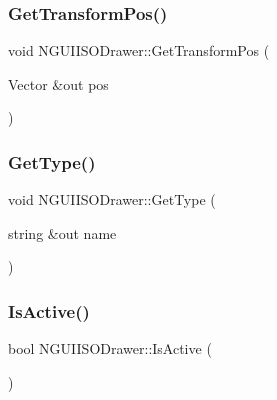 \hypertarget{class_n_g_u_i_i_s_o_drawer_a9ff810d55ed62edcabe81e67e9bb7430}{}\label{class_n_g_u_i_i_s_o_drawer_a9ff810d55ed62edcabe81e67e9bb7430} 
\subsubsection{\texorpdfstring{Get\+Transform\+Pos()}{GetTransformPos()}}
{\footnotesize\ttfamily void N\+G\+U\+I\+I\+S\+O\+Drawer\+::\+Get\+Transform\+Pos (\begin{DoxyParamCaption}\item[{Vector \&out}]{pos }\end{DoxyParamCaption})}

\hypertarget{class_n_g_u_i_i_s_o_drawer_a92a046d15ee074ef5a0ce2bc4ee4018a}{}\label{class_n_g_u_i_i_s_o_drawer_a92a046d15ee074ef5a0ce2bc4ee4018a} 
\subsubsection{\texorpdfstring{Get\+Type()}{GetType()}}
{\footnotesize\ttfamily void N\+G\+U\+I\+I\+S\+O\+Drawer\+::\+Get\+Type (\begin{DoxyParamCaption}\item[{string \&out}]{name }\end{DoxyParamCaption})}

\hypertarget{class_n_g_u_i_i_s_o_drawer_aca0e399b047b07c00ca9158721542615}{}\label{class_n_g_u_i_i_s_o_drawer_aca0e399b047b07c00ca9158721542615} 
\subsubsection{\texorpdfstring{Is\+Active()}{IsActive()}}
{\footnotesize\ttfamily bool N\+G\+U\+I\+I\+S\+O\+Drawer\+::\+Is\+Active (\begin{DoxyParamCaption}{ }\end{DoxyParamCaption})}

\hypertarget{class_n_g_u_i_i_s_o_drawer_afa0f62ab41556ea14ecd9a40a809f237}{}\label{class_n_g_u_i_i_s_o_drawer_afa0f62ab41556ea14ecd9a40a809f237} 
